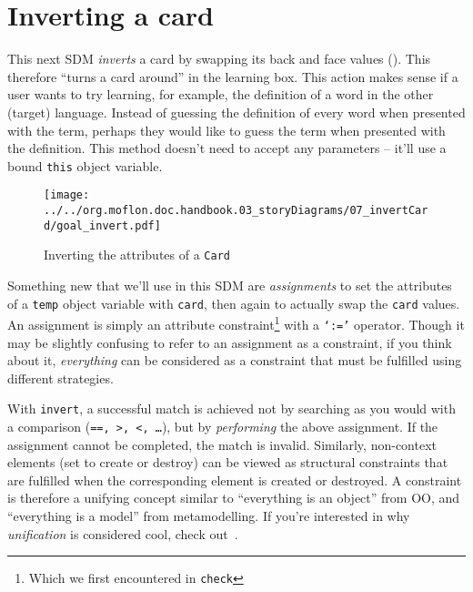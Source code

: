 \newpage
\hypertarget{sec:invertCard}{}
\section{Inverting a card}
\genHeader

This next SDM \emph{inverts} a card by swapping its back and face values (). This therefore ``turns a card around'' in the learning
box. This action makes sense if a user wants to try learning, for example, the definition of a word in the other (target) language. Instead of guessing the
definition of every word when presented with the term, perhaps they would like to guess the term when presented with the definition. This method doesn't need to
accept any parameters -- it'll use a bound \texttt{this} object variable.

\vspace{0.5cm}

\begin{figure}[htbp]
	\centering
    \texttt{[image: ../../org.moflon.doc.handbook.03\_storyDiagrams/07\_invertCard/goal\_invert.pdf]}
 	\caption{Inverting the attributes of a \texttt{Card}}
 	\label{fig:goal_invert}
\end{figure}
\FloatBarrier

Something new that we'll use in this SDM are \emph{assignments} to set the attributes of a \texttt{temp} object variable with \texttt{card},
then again to actually swap the \texttt{card} values. An assignment is simply an attribute constraint\footnote{Which we first encountered in \texttt{check}}
with a \texttt{`:='} operator. Though it may be slightly confusing to refer to an assignment as a constraint, if you think about it, \emph{everything} can be
considered as a constraint that must be fulfilled using different strategies.

With \texttt{invert}, a successful match is achieved not by searching as you would with a comparison (\texttt{==, >, <, \ldots}), but by \emph{performing} the
above assignment. If the assignment cannot be completed, the match is invalid. Similarly, non-context elements (set to create or destroy) can be viewed as
structural constraints that are fulfilled when the corresponding element is created or destroyed.  A constraint is therefore a unifying concept similar to
``everything is an object'' from OO, and ``everything is a model'' from metamodelling.  If you're interested in why \emph{unification} is considered cool, check
out~\cite{BEZ05}.





